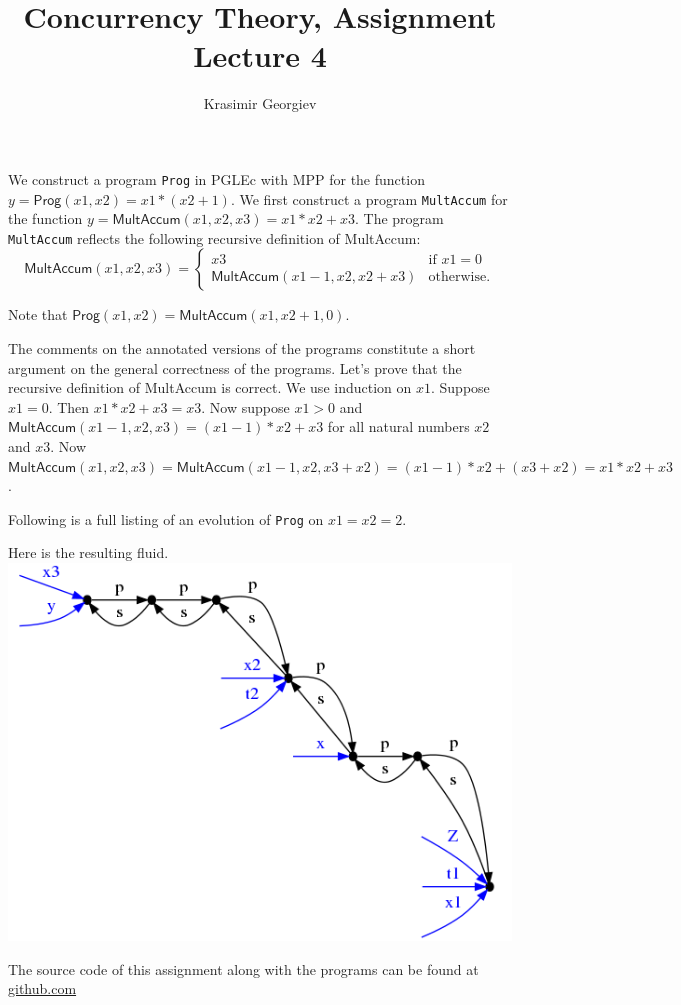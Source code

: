\documentclass[a4paper]{article}
\title{Concurrency Theory, Assignment Lecture 4}
\author{Krasimir Georgiev}
\newcommand{\prog}[1]{\texttt{#1}}
\newcommand{\pfun}[1]{\textsf{#1}}
\begin{document}
\maketitle

We construct a program \prog{Prog} in PGLEc with MPP for the function
$y = \pfun{Prog}(x1, x2) = x1 * (x2 + 1)$.
We first construct a program \prog{MultAccum} for the function $y =
\pfun{MultAccum}(x1, x2, x3) = x1 * x2 + x3$.
The program \prog{MultAccum} reflects the following recursive definition of
\pfun{MultAccum}:
\[
\pfun{MultAccum}(x1, x2, x3) =
\begin{cases}
    x3 & \mbox{if } x1 = 0 \\
    \pfun{MultAccum}(x1 - 1, x2, x2 + x3) & \mbox{otherwise.}
\end{cases}
\]


\newpage
Note that $\pfun{Prog}(x1, x2) = \pfun{MultAccum}(x1, x2 + 1, 0)$.

The comments on the annotated versions of the programs constitute a short
argument on the general correctness of the programs. Let's prove that the
recursive definition of \pfun{MultAccum} is correct. We use induction on $x1$.
Suppose $x1 = 0$. Then $x1*x2 + x3 = x3$.
Now suppose $x1 > 0$ and $\pfun{MultAccum}(x1 - 1, x2, x3) = (x1 - 1)*x2 + x3$
for all natural numbers $x2$ and $x3$.
Now $\pfun{MultAccum}(x1, x2, x3) = \pfun{MultAccum}(x1 - 1, x2, x3 + x2) =
(x1 - 1)*x2 + (x3 + x2) = x1*x2 + x3$.

Following is a full listing of an evolution of \prog{Prog} on $x1=x2=2$.


Here is the resulting fluid.
\includegraphics[scale=0.5]{fluid_2_2.png}

The source code of this assignment along with the programs can be found at
\url{github.com}
\end{document}
